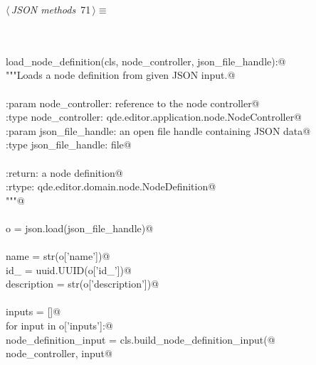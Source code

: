 \documentclass[
    a4paper,      %
    10pt,         %
    openright,    %
    notitlepage,  %
    parskip=half, %
]{scrreprt}       %
\theoremstyle{definition}                    %
\begin{document}
\begin{flushleft} \small
\begin{minipage}{\linewidth}\label{scrap116}\raggedright\small
{} $\langle\,${\itshape JSON methods}\nobreak\ {\footnotesize {71}}$\,\rangle\equiv$
\vspace{-1exm}
\begin{list}{}{} \item
\mbox{}\lstinline@@\\
\mbox{}\lstinline@classmethod@\\
\mbox{}\lstinline@def load_node_definition(cls, node_controller, json_file_handle):@\\
\mbox{}\lstinline@    """Loads a node definition from given JSON input.@\\
\mbox{}\lstinline@@\\
\mbox{}\lstinline@    :param node_controller: reference to the node controller@\\
\mbox{}\lstinline@    :type node_controller: qde.editor.application.node.NodeController@\\
\mbox{}\lstinline@    :param json_file_handle: an open file handle containing JSON data@\\
\mbox{}\lstinline@    :type json_file_handle: file@\\
\mbox{}\lstinline@@\\
\mbox{}\lstinline@    :return: a node definition@\\
\mbox{}\lstinline@    :rtype: qde.editor.domain.node.NodeDefinition@\\
\mbox{}\lstinline@    """@\\
\mbox{}\lstinline@@\\
\mbox{}\lstinline@    o = json.load(json_file_handle)@\\
\mbox{}\lstinline@@\\
\mbox{}\lstinline@    name        = str(o['name'])@\\
\mbox{}\lstinline@    id_         = uuid.UUID(o['id_'])@\\
\mbox{}\lstinline@    description = str(o['description'])@\\
\mbox{}\lstinline@@\\
\mbox{}\lstinline@    inputs = []@\\
\mbox{}\lstinline@    for input in o['inputs']:@\\
\mbox{}\lstinline@        node_definition_input = cls.build_node_definition_input(@\\
\mbox{}\lstinline@            node_controller, input@\\

\end{list}
\end{minipage}
\end{flushleft}
\end{document}
